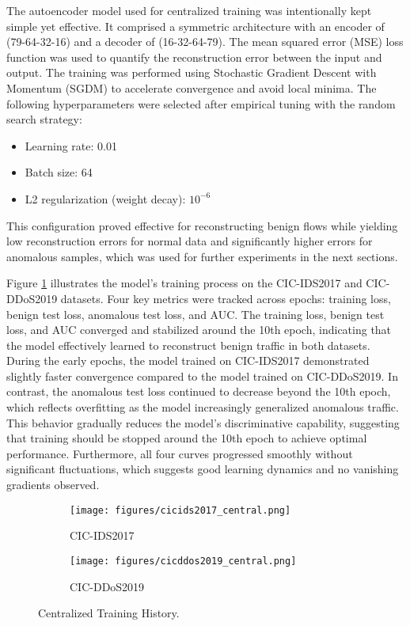 The autoencoder model used for centralized training was intentionally kept simple yet effective. It comprised a symmetric architecture with an encoder of (79-64-32-16) and a decoder of (16-32-64-79). The mean squared error (MSE) loss function was used to quantify the reconstruction error between the input and output. The training was performed using Stochastic Gradient Descent with Momentum (SGDM) to accelerate convergence and avoid local minima. The following hyperparameters were selected after empirical tuning with the random search strategy:

\begin{itemize}
    \item Learning rate: 0.01
    \item Batch size: 64
    \item L2 regularization (weight decay): $10^{-6}$
\end{itemize}
 
This configuration proved effective for reconstructing benign flows while yielding low reconstruction errors for normal data and significantly higher errors for anomalous samples, which was used for further experiments in the next sections.

Figure \ref{fig:central_perf} illustrates the model’s training process on the CIC-IDS2017 and CIC-DDoS2019 datasets. Four key metrics were tracked across epochs: training loss, benign test loss, anomalous test loss, and AUC. The training loss, benign test loss, and AUC converged and stabilized around the 10th epoch, indicating that the model effectively learned to reconstruct benign traffic in both datasets. During the early epochs, the model trained on CIC-IDS2017 demonstrated slightly faster convergence compared to the model trained on CIC-DDoS2019. In contrast, the anomalous test loss continued to decrease beyond the 10th epoch, which reflects overfitting as the model increasingly generalized anomalous traffic. This behavior gradually reduces the model’s discriminative capability, suggesting that training should be stopped around the 10th epoch to achieve optimal performance. Furthermore, all four curves progressed smoothly without significant fluctuations, which suggests good learning dynamics and no vanishing gradients observed.

\begin{figure}[h]
    \centering

    \begin{subfigure}[b]{0.49\textwidth}
        \centering
        \texttt{[image: figures/cicids2017\_central.png]}
        \caption{CIC-IDS2017}
    \end{subfigure}
    \hfill
    \begin{subfigure}[b]{0.49\textwidth}
        \centering
        \texttt{[image: figures/cicddos2019\_central.png]}
        \caption{CIC-DDoS2019}
    \end{subfigure}

    \caption{Centralized Training History.}
    \label{fig:central_perf}
\end{figure}

